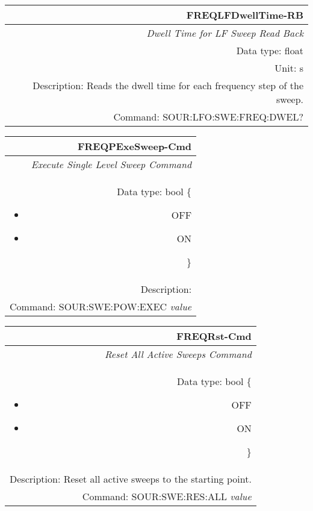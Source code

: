 \documentclass[openany]{article}
\begin{document}
		\begin{tabular}{N}
			\hline
			\bfseries FREQLFDwellTime-RB \\ \hline
			\emph{Dwell Time for LF Sweep Read Back} \\
			Data type: float \\
			Unit: s \\
			Description: Reads the dwell time for each frequency step of the sweep. \\
			Command: SOUR:LFO:SWE:FREQ:DWEL? \\

		\end{tabular}
%
		\begin{tabular}{N}
			\hline
			\bfseries FREQPExeSweep-Cmd \\ \hline
			\emph{Execute Single Level Sweep Command} \\
			Data type: bool \{\begin{itemize}[noitemsep]
				\small
				\item[] OFF
				\item[] ON
			\end{itemize}\} \\
			Description:  \\
			Command: SOUR:SWE:POW:EXEC \emph{value} \\

		\end{tabular}
%
		\begin{tabular}{N}
			\hline
			\bfseries FREQRst-Cmd \\ \hline
			\emph{Reset All Active Sweeps Command} \\
			Data type: bool \{\begin{itemize}[noitemsep]
				\small
				\item[] OFF
				\item[] ON
			\end{itemize}\} \\
			Description: Reset all active sweeps to the starting point. \\
			Command: SOUR:SWE:RES:ALL \emph{value} \\

		\end{tabular}
%

\end{document}
